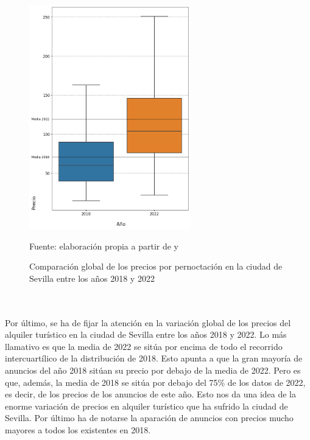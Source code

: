 \documentclass[a4paper,10pt]{article}
\begin{document}
            \begin{figure}
                \begin{flushleft}
                    \includegraphics*[width = 7cm]{graphics/seville_global_comparison_price.png}
                    \begin{flushleft}
                        \footnotesize{Fuente: elaboración propia a partir de \cite[(2)]{datahippo} y \cite[(1)]{insideairbnb}}
                    \end{flushleft}
                    \caption{Comparación global de los precios por pernoctación en la ciudad de Sevilla entre los años 2018 y 2022}
                \end{flushleft}
            \end{figure}

            \ \\
            
            \ \\

            \noindent
            Por último, se ha de fijar la atención en la variación global de los precios del alquiler turístico en la ciudad de Sevilla 
            entre los años 2018 y 2022. Lo más llamativo es que la media de 2022 se sitúa por encima de todo el recorrido intercuartílico de 
            la distribución de 2018. Esto apunta a que la gran mayoría de anuncios del año 2018 sitúan su precio por debajo de la media de 2022. 
            Pero es que, además, la media de 2018 se sitúa por debajo del 75\% de los datos de 2022, es decir, de los precios de los anuncios de este año.
            Esto nos da una idea de la enorme variación de precios en alquiler turístico que ha sufrido la ciudad de Sevilla. Por último ha de notarse
            la aparación de anuncios con precios mucho mayores a todos los existentes en 2018.
            
\end{document}
